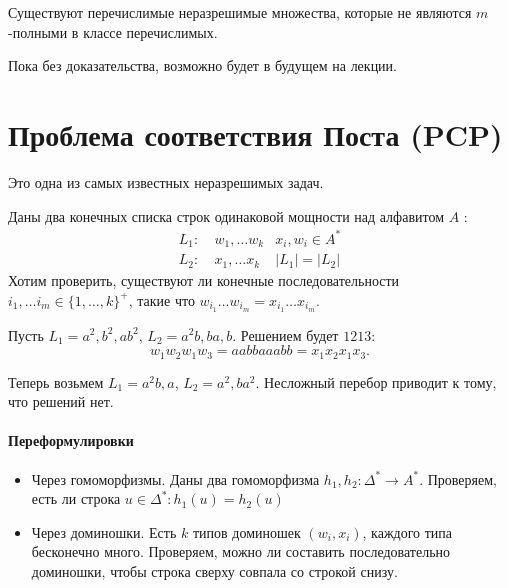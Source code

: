 \begin{st}
	Существуют перечислимые неразрешимые множества, которые не являются $ m$-полными в классе перечислимых.
\end{st}
\begin{proof*}
    Пока без доказательства, возможно будет в будущем на лекции.
\end{proof*}


\section{Проблема соответствия Поста (PCP)}
Это одна из самых известных неразрешимых задач.

Даны два конечных списка строк одинаковой мощности над алфавитом $ A$ :
\[
\begin{aligned}
	L_1 :& ~w_1, \ldots w_k & x_i, w_i \in A^{*} \\
	L_2: & ~x_1, \ldots x_k & \lvert L_1 \rvert = \lvert L_2 \rvert  
\end{aligned}
\]
Хотим проверить, существуют ли конечные последовательности $  i_1, \ldots i_m \in \{1, \ldots , k\}^+$, такие что $ w_{i_1}\ldots w_{i_m} = x_{i_1}\ldots x_{i_m}$.


\begin{ex}
    Пусть $  L_1 = a^2, b^2, ab ^2$, $  L_2 = a^2b, ba, b$. Решением будет $ 1213$:
	 \[
	w_1 w_2 w_1 w_3 = aabbaaabb = x_1x_2x_1x_3
	.\] 
\end{ex}
\begin{ex}
    Теперь возьмем  $  L_1 = a^2b, a$, $  L_2 = a^2, ba^2$. Несложный перебор приводит к тому, что решений нет.
\end{ex}

\paragraph{Переформулировки}
\begin{itemize}
	\item Через гомоморфизмы. Даны два гомоморфизма $ h_1, h_2\colon \Delta^{*} \to A^{*}$. Проверяем, есть ли строка $ u \in \Delta^{*}\colon h_1(u) = h_2(u)$ 
	\item Через доминошки. Есть $ k$ типов доминошек $ (w_i, x_i)$, каждого типа бесконечно много. Проверяем, можно ли составить последовательно доминошки, чтобы строка сверху совпала со строкой снизу.
\end{itemize}


